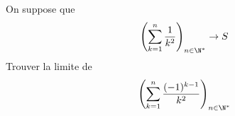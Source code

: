 On suppose que 
\[\left(\sum_{k=1}^n  \dfrac{1}{k^2} \right)_{n\in\N^*} \rightarrow S\]
Trouver la limite de 
\[\left(\sum_{k=1}^n  \dfrac{(-1)^{k-1}}{k^2} \right)_{n\in\N^*}\]
\bigskip
